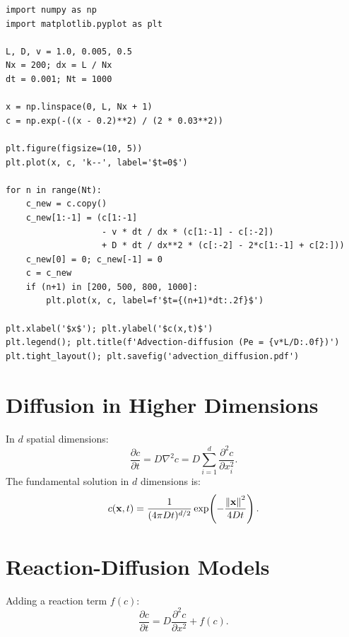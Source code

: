 \begin{codeblock}[title=\textbf{Advection-diffusion}]
\begin{verbatim}
import numpy as np
import matplotlib.pyplot as plt

L, D, v = 1.0, 0.005, 0.5
Nx = 200; dx = L / Nx
dt = 0.001; Nt = 1000

x = np.linspace(0, L, Nx + 1)
c = np.exp(-((x - 0.2)**2) / (2 * 0.03**2))

plt.figure(figsize=(10, 5))
plt.plot(x, c, 'k--', label='$t=0$')

for n in range(Nt):
    c_new = c.copy()
    c_new[1:-1] = (c[1:-1]
                   - v * dt / dx * (c[1:-1] - c[:-2])
                   + D * dt / dx**2 * (c[:-2] - 2*c[1:-1] + c[2:]))
    c_new[0] = 0; c_new[-1] = 0
    c = c_new
    if (n+1) in [200, 500, 800, 1000]:
        plt.plot(x, c, label=f'$t={(n+1)*dt:.2f}$')

plt.xlabel('$x$'); plt.ylabel('$c(x,t)$')
plt.legend(); plt.title(f'Advection-diffusion (Pe = {v*L/D:.0f})')
plt.tight_layout(); plt.savefig('advection_diffusion.pdf')
\end{verbatim}
\end{codeblock}

\section{Diffusion in Higher Dimensions}

\begin{definition}
In $d$ spatial dimensions:
\[
  \frac{\partial c}{\partial t} = D\nabla^2 c
  = D\sum_{i=1}^d \frac{\partial^2 c}{\partial x_i^2}.
\]
The fundamental solution in $d$ dimensions is:
\[
  c(\mathbf{x},t) = \frac{1}{(4\pi Dt)^{d/2}}
  \exp\!\left(-\frac{\left\| \mathbf{x} \right\|^2}{4Dt}\right).
\]
\end{definition}

\section{Reaction-Diffusion Models}
\label{sec:reaction_diffusion}

\begin{definition}
Adding a reaction term $f(c)$:
\[
  \frac{\partial c}{\partial t} = D\frac{\partial^2 c}{\partial x^2}
  + f(c).
\]
\end{definition}

